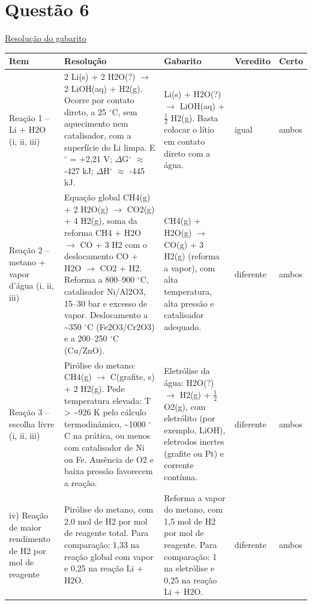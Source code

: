 \documentclass{article}%
\begin{document}
\section*{Questão 6}%
\href{https://poliedroresolve.sistemapoliedro.com.br/vestibulares/ita/2027/ita-2-fase-dia-2-21-10-2026-2-fase-dia-2/dissertativa-6-quimica-2-fase-dia-2-ita-2027}{Resolução do gabarito}\par\smallskip%
\begin{longtable}{@{}p{} p{} p{} p{} p{}@{}}\toprule Item & Resolução & Gabarito & Veredito & Certo \\ \midrule
Reação 1 -- Li + H2O (i, ii, iii) & 2 Li(s) + 2 H2O(?) $\to$ 2 LiOH(aq) + H2(g). Ocorre por contato direto, a 25 $^\circ$C, sem aquecimento nem catalisador, com a superfície do Li limpa. E$^\circ$ = +2,21 V; $\Delta$G$^\circ$ $\approx$ -427 kJ; $\Delta$H$^\circ$ $\approx$ -445 kJ. & Li(s) + H2O(?) $\to$ LiOH(aq) + $\frac12$ H2(g). Basta colocar o lítio em contato direto com a água. & igual & ambos \\
Reação 2 -- metano + vapor d'água (i, ii, iii) & Equação global CH4(g) + 2 H2O(g) $\to$ CO2(g) + 4 H2(g), soma da reforma CH4 + H2O $\to$ CO + 3 H2 com o deslocamento CO + H2O $\to$ CO2 + H2. Reforma a 800--900 $^\circ$C, catalisador Ni/Al2O3, 15--30 bar e excesso de vapor. Deslocamento a \textasciitilde{}350 $^\circ$C (Fe2O3/Cr2O3) e a 200--250 $^\circ$C (Cu/ZnO). & CH4(g) + H2O(g) $\to$ CO(g) + 3 H2(g) (reforma a vapor), com alta temperatura, alta pressão e catalisador adequado. & diferente & ambos \\
Reação 3 -- escolha livre (i, ii, iii) & Pirólise do metano: CH4(g) $\to$ C(grafite, s) + 2 H2(g). Pede temperatura elevada: T > \textasciitilde{}926 K pelo cálculo termodinâmico, \textasciitilde{}1000 $^\circ$C na prática, ou menos com catalisador de Ni ou Fe. Ausência de O2 e baixa pressão favorecem a reação. & Eletrólise da água: H2O(?) $\to$ H2(g) + $\frac12$ O2(g), com eletrólito (por exemplo, LiOH), eletrodos inertes (grafite ou Pt) e corrente contínua. & diferente & ambos \\
iv) Reação de maior rendimento de H2 por mol de reagente & Pirólise do metano, com 2,0 mol de H2 por mol de reagente total. Para comparação: 1,33 na reação global com vapor e 0,25 na reação Li + H2O. & Reforma a vapor do metano, com 1,5 mol de H2 por mol de reagente. Para comparação: 1 na eletrólise e 0,25 na reação Li + H2O. & diferente & ambos \\
\bottomrule\end{longtable}%
\end{document}
